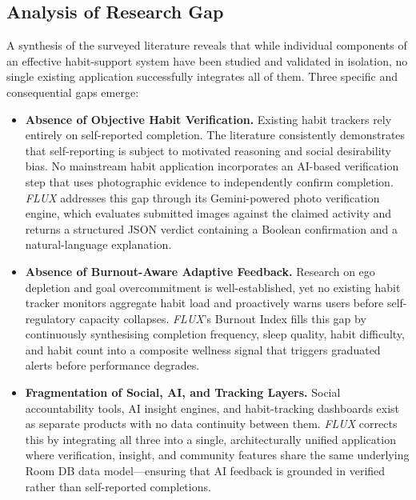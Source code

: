 \documentclass[12pt,a4paper]{article}
\newcommand{\FL}{\textit{FLUX}}
\begin{document}
\subsection{Analysis of Research Gap}

A synthesis of the surveyed literature reveals that while individual components of an
effective habit-support system have been studied and validated in isolation, no single
existing application successfully integrates all of them. Three specific and
consequential gaps emerge:

\begin{itemize}[leftmargin=1.5em, itemsep=6pt]

    \item \textbf{Absence of Objective Habit Verification.}
    Existing habit trackers rely entirely on self-reported completion. The literature
    consistently demonstrates that self-reporting is subject to motivated reasoning and
    social desirability bias. No mainstream habit application incorporates an AI-based
    verification step that uses photographic evidence to independently confirm completion.
    \FL{} addresses this gap through its Gemini-powered photo verification engine, which
    evaluates submitted images against the claimed activity and returns a structured
    JSON verdict containing a Boolean confirmation and a natural-language explanation.

    \item \textbf{Absence of Burnout-Aware Adaptive Feedback.}
    Research on ego depletion and goal overcommitment is well-established, yet no
    existing habit tracker monitors aggregate habit load and proactively warns users
    before self-regulatory capacity collapses. \FL{}'s Burnout Index fills this gap
    by continuously synthesising completion frequency, sleep quality, habit difficulty,
    and habit count into a composite wellness signal that triggers graduated alerts
    before performance degrades.

    \item \textbf{Fragmentation of Social, AI, and Tracking Layers.}
    Social accountability tools, AI insight engines, and habit-tracking dashboards
    exist as separate products with no data continuity between them. \FL{} corrects
    this by integrating all three into a single, architecturally unified application
    where verification, insight, and community features share the same underlying
    Room DB data model---ensuring that AI feedback is grounded in verified rather
    than self-reported completions.

\end{itemize}
\end{document}

